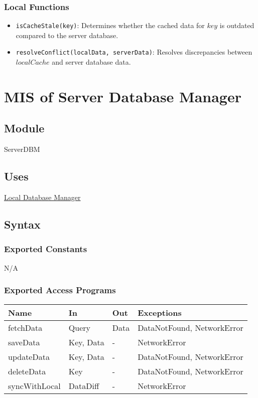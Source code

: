 \documentclass[12pt, titlepage]{article}
\begin{document}
\subsubsection{Local Functions}

\begin{itemize}
  \item \texttt{isCacheStale(key)}: Determines whether the cached data for \( key \) is outdated compared to the server database.
  \item \texttt{resolveConflict(localData, serverData)}: Resolves discrepancies between \( localCache \) and server database data.
\end{itemize}

\newpage

\section{MIS of Server Database Manager} \label{server-dbm}

\subsection{Module}

ServerDBM

\subsection{Uses}

\hyperref[local-dbm]{Local Database Manager}

\subsection{Syntax}

\subsubsection{Exported Constants}

N/A

\subsubsection{Exported Access Programs}

\begin{center}
  \begin{tabular}{p{4cm} p{4cm} p{3cm} p{3cm}}
    \hline
    \textbf{Name} & \textbf{In} & \textbf{Out} & \textbf{Exceptions}        \\
    \hline
    fetchData     & Query       & Data         & DataNotFound, NetworkError \\
    saveData      & Key, Data   & -            & NetworkError               \\
    updateData    & Key, Data   & -            & DataNotFound, NetworkError \\
    deleteData    & Key         & -            & DataNotFound, NetworkError \\
    syncWithLocal & DataDiff    & -            & NetworkError               \\
    \hline
  \end{tabular}
\end{center}
\end{document}
